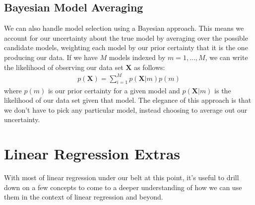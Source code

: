 \subsection{Bayesian Model Averaging}
We can also handle model selection using a Bayesian approach. This means we account for our uncertainty about the true model by averaging over the possible candidate models, weighting each model by our prior certainty that it is the one producing our data. If we have $M$ models indexed by $m = 1, ..., M$, we can write the likelihood of observing our data set $\textbf{X}$ as follows:
\begin{align*}
    p(\textbf{X}) = \sum_{i=1}^{M} p(\textbf{X}|m)p(m)
\end{align*}
where $p(m)$ is our prior certainty for a given model and $p(\textbf{X}|m)$ is the likelihood of our data set given that model. The elegance of this approach is that we don't have to pick any particular model, instead choosing to average out our uncertainty.

\section{Linear Regression Extras}
With most of linear regression under our belt at this point, it's useful to drill down on a few concepts to come to a deeper understanding of how we can use them in the context of linear regression and beyond.
